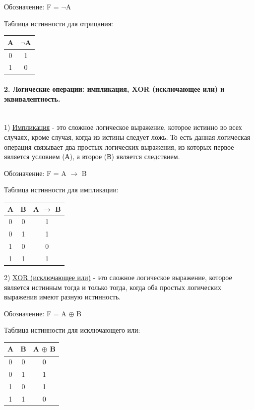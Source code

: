 \documentclass[a4paper, 12pt]{article}
\newcommand{\parag}[1]{\paragraph{#1}\mbox{}\\}
\begin{document}
Обозначение: F = $\neg$A

Таблица истинности для отрицания:
\begin{center}
    \begin{tabular}{|c|c|}
        \hline
        A & $\neg$A  \\
        \hline
        0 & 1  \\
         \hline
        1 & 0  \\
        \hline
    \end{tabular}
\end{center}

\parag{2. Логические операции: импликация, XOR (исключающее или) и эквивалентность.}
1) \underline{Импликация} - это сложное логическое выражение, которое истинно во всех случаях, кроме случая, когда из истины следует ложь. То есть данная логическая операция связывает два простых логических выражения, из которых первое является условием (А), а второе (В) является следствием.

Обозначение: F = A $\to$ B

Таблица истинности для импликации:

\begin{center}
    \begin{tabular}{|c|c|c|}
        \hline
        A & B & A $\to$ B  \\
        \hline
        0 & 0 & 1  \\
         \hline
        0 & 1 & 1  \\
        \hline
        1 & 0 & 0 \\
        \hline
        1 & 1 & 1 \\
        \hline
    \end{tabular}
\end{center}

2) \underline{XOR (исключающее или)} -  это сложное логическое выражение, которое является истинным тогда и только тогда, когда оба простых логических выражения имеют разную истинность.

Обозначение: F = A $\oplus$ B

Таблица истинности для исключающего или:

\begin{center}
    \begin{tabular}{|c|c|c|}
        \hline
        A & B & A $\oplus$ B  \\
        \hline
        0 & 0 & 0  \\
         \hline
        0 & 1 & 1  \\
        \hline
        1 & 0 & 1 \\
        \hline
        1 & 1 & 0 \\
        \hline
    \end{tabular}
\end{center}
\end{document}

